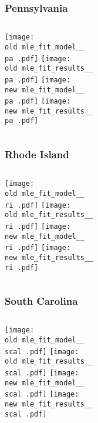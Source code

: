 \documentclass{beamer}
\newcommand{\old}{current_two_stage_output/pyseir/state_summaries/reports/}
\newcommand{\new}{new_shortest_t_delta/pyseir/state_summaries/reports/}
\newcommand{\pa}{Pennsylvania__42}
\newcommand{\ri}{Rhode Island__44}
\newcommand{\scal}{South Carolina__45}
\begin{document}
\begin{frame}
\frametitle{Pennsylvania}
    \begin{columns}[t]
       \texttt{[image: \\old mle\_fit\_model\_\_\\pa .pdf]}
       \texttt{[image: \\old mle\_fit\_results\_\_\\pa .pdf]}   
       \texttt{[image: \\new mle\_fit\_model\_\_\\pa .pdf]}
       \texttt{[image: \\new mle\_fit\_results\_\_\\pa .pdf]}   
\end{columns}
\end{frame}

\begin{frame}
\frametitle{Rhode Island}
    \begin{columns}[t]
       \texttt{[image: \\old mle\_fit\_model\_\_\\ri .pdf]}
       \texttt{[image: \\old mle\_fit\_results\_\_\\ri .pdf]}   
       \texttt{[image: \\new mle\_fit\_model\_\_\\ri .pdf]}
       \texttt{[image: \\new mle\_fit\_results\_\_\\ri .pdf]}   
\end{columns}
\end{frame}

\begin{frame}
\frametitle{South Carolina}
    \begin{columns}[t]
       \texttt{[image: \\old mle\_fit\_model\_\_\\scal .pdf]}
       \texttt{[image: \\old mle\_fit\_results\_\_\\scal .pdf]}   
       \texttt{[image: \\new mle\_fit\_model\_\_\\scal .pdf]}
       \texttt{[image: \\new mle\_fit\_results\_\_\\scal .pdf]}   
\end{columns}
\end{frame}
\end{document}
